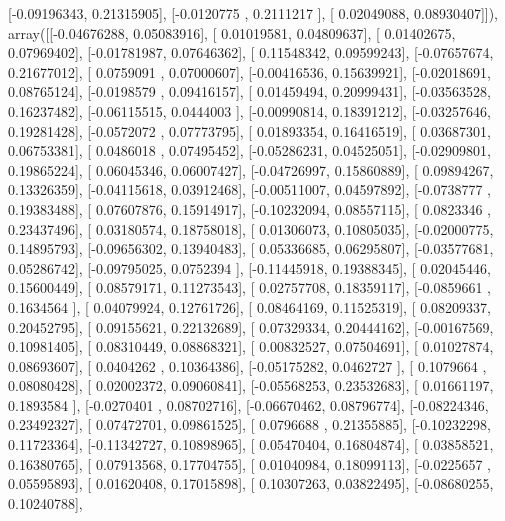 \documentclass{article}
\begin{document}
       [-0.09196343,  0.21315905],
       [-0.0120775 ,  0.2111217 ],
       [ 0.02049088,  0.08930407]]), array([[-0.04676288,  0.05083916],
       [ 0.01019581,  0.04809637],
       [ 0.01402675,  0.07969402],
       [-0.01781987,  0.07646362],
       [ 0.11548342,  0.09599243],
       [-0.07657674,  0.21677012],
       [ 0.0759091 ,  0.07000607],
       [-0.00416536,  0.15639921],
       [-0.02018691,  0.08765124],
       [-0.0198579 ,  0.09416157],
       [ 0.01459494,  0.20999431],
       [-0.03563528,  0.16237482],
       [-0.06115515,  0.0444003 ],
       [-0.00990814,  0.18391212],
       [-0.03257646,  0.19281428],
       [-0.0572072 ,  0.07773795],
       [ 0.01893354,  0.16416519],
       [ 0.03687301,  0.06753381],
       [ 0.0486018 ,  0.07495452],
       [-0.05286231,  0.04525051],
       [-0.02909801,  0.19865224],
       [ 0.06045346,  0.06007427],
       [-0.04726997,  0.15860889],
       [ 0.09894267,  0.13326359],
       [-0.04115618,  0.03912468],
       [-0.00511007,  0.04597892],
       [-0.0738777 ,  0.19383488],
       [ 0.07607876,  0.15914917],
       [-0.10232094,  0.08557115],
       [ 0.0823346 ,  0.23437496],
       [ 0.03180574,  0.18758018],
       [ 0.01306073,  0.10805035],
       [-0.02000775,  0.14895793],
       [-0.09656302,  0.13940483],
       [ 0.05336685,  0.06295807],
       [-0.03577681,  0.05286742],
       [-0.09795025,  0.0752394 ],
       [-0.11445918,  0.19388345],
       [ 0.02045446,  0.15600449],
       [ 0.08579171,  0.11273543],
       [ 0.02757708,  0.18359117],
       [-0.0859661 ,  0.1634564 ],
       [ 0.04079924,  0.12761726],
       [ 0.08464169,  0.11525319],
       [ 0.08209337,  0.20452795],
       [ 0.09155621,  0.22132689],
       [ 0.07329334,  0.20444162],
       [-0.00167569,  0.10981405],
       [ 0.08310449,  0.08868321],
       [ 0.00832527,  0.07504691],
       [ 0.01027874,  0.08693607],
       [ 0.0404262 ,  0.10364386],
       [-0.05175282,  0.0462727 ],
       [ 0.1079664 ,  0.08080428],
       [ 0.02002372,  0.09060841],
       [-0.05568253,  0.23532683],
       [ 0.01661197,  0.1893584 ],
       [-0.0270401 ,  0.08702716],
       [-0.06670462,  0.08796774],
       [-0.08224346,  0.23492327],
       [ 0.07472701,  0.09861525],
       [ 0.0796688 ,  0.21355885],
       [-0.10232298,  0.11723364],
       [-0.11342727,  0.10898965],
       [ 0.05470404,  0.16804874],
       [ 0.03858521,  0.16380765],
       [ 0.07913568,  0.17704755],
       [ 0.01040984,  0.18099113],
       [-0.0225657 ,  0.05595893],
       [ 0.01620408,  0.17015898],
       [ 0.10307263,  0.03822495],
       [-0.08680255,  0.10240788],
\end{document}
